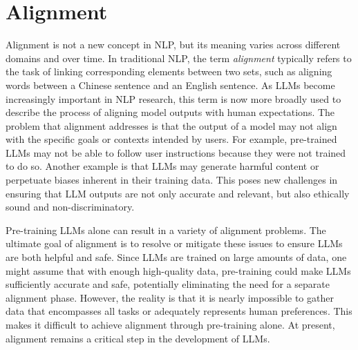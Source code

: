 
%




\chapter{Alignment}

\thispagestyle{chapterurl} %

\noindent Alignment is not a new concept in NLP, but its meaning varies across different domains and over time. In traditional NLP, the term \textit{alignment} typically refers to the task of linking corresponding elements between two sets, such as aligning words between a Chinese sentence and an English sentence. As LLMs become increasingly important in NLP research, this term is now more broadly used to describe the process of aligning model outputs with human expectations. The problem that alignment addresses is that the output of a model may not align with the specific goals or contexts intended by users. For example, pre-trained LLMs may not be able to follow user instructions because they were not trained to do so. Another example is that LLMs may generate harmful content or perpetuate biases inherent in their training data. This poses new challenges in ensuring that LLM outputs are not only accurate and relevant, but also ethically sound and non-discriminatory.

Pre-training LLMs alone can result in a variety of alignment problems. The ultimate goal of alignment is to resolve or mitigate these issues to ensure LLMs are both helpful and safe. Since LLMs are trained on large amounts of data, one might assume that with enough high-quality data, pre-training could make LLMs sufficiently accurate and safe, potentially eliminating the need for a separate alignment phase. However, the reality is that it is nearly impossible to gather data that encompasses all tasks or adequately represents human preferences. This makes it difficult to achieve alignment through pre-training alone. At present, alignment remains a critical step in the development of LLMs.

